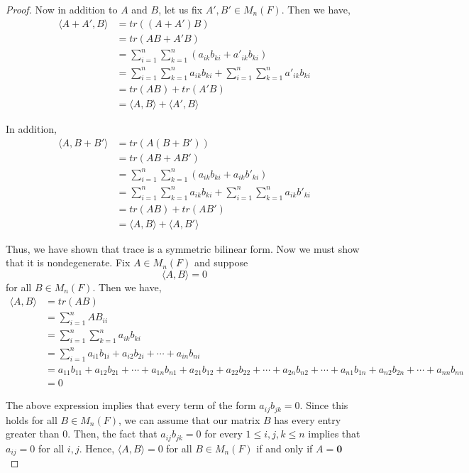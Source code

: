 \documentclass[11pt, reqno]{amsart}
\theoremstyle{plain}
\theoremstyle{definition}
\theoremstyle{example}
\def\<{\langle} \def\>{\rangle}
\begin{document}
\begin{proof}
Now in addition to $A$ and $B$, let us fix $A', B' \in M_n(F)$. Then we have,
\begin{align*}
\<A + A', B\> &= tr((A+A')B)\\
&= tr(AB + A'B)\\
&= \sum_{i=1}^n \sum_{k=1}^n \left( a_{ik}b_{ki} + a'_{ik}b_{ki} \right)\\
&= \sum_{i=1}^n \sum_{k=1}^n a_{ik}b_{ki} + \sum_{i=1}^n \sum_{k=1}^n a'_{ik}b_{ki}\\
&= tr(AB) + tr(A'B)\\
&= \<A, B\> + \<A', B\>
\end{align*}

In addition,
\begin{align*}
\<A, B + B'\> &= tr(A(B+B'))\\
&= tr(AB + AB')\\
&= \sum_{i=1}^n \sum_{k=1}^n \left( a_{ik}b_{ki} + a_{ik}b'_{ki} \right)\\
&= \sum_{i=1}^n \sum_{k=1}^n a_{ik}b_{ki} + \sum_{i=1}^n \sum_{k=1}^n a_{ik}b'_{ki}\\
&= tr(AB) + tr(AB')\\
&= \<A, B\> + \<A, B'\>
\end{align*}

Thus, we have shown that trace is a symmetric bilinear form. Now we must show that it is nondegenerate. Fix $A \in M_n(F)$ and suppose $$\<A, B\> = 0$$ for all $B \in M_n(F)$. Then we have,
\begin{align*}
\<A, B\> &= tr(AB)\\
&= \sum_{i=1}^n AB_{ii}\\
&= \sum_{i=1}^n \sum_{k=1}^n a_{ik}b_{ki}\\
&= \sum_{i=1}^n a_{i1}b_{1i} + a_{i2}b_{2i} + \cdots + a_{in}b_{ni}\\
&= a_{11}b_{11} + a_{12}b_{21} + \cdots + a_{1n}b_{n1} + a_{21}b_{12} + a_{22}b_{22} + \cdots + a_{2n}b_{n2} + \cdots + a_{n1}b_{1n} + a_{n2}b_{2n} + \cdots + a_{nn}b_{nn}\\
&= 0
\end{align*}

The above expression implies that every term of the form $a_{ij}b_{jk} = 0$. Since this holds for all $B \in M_n(F)$, we can assume that our matrix $B$ has every entry greater than $0$. Then, the fact that $a_{ij}b_{jk} = 0$ for every $1 \leq i,j,k \leq n$ implies that $a_{ij} = 0$ for all $i, j$. Hence, $\<A, B\> = 0$ for all $B \in M_n(F)$ if and only if $A = \mathbf{0}$\\


\end{proof}
\end{document}
